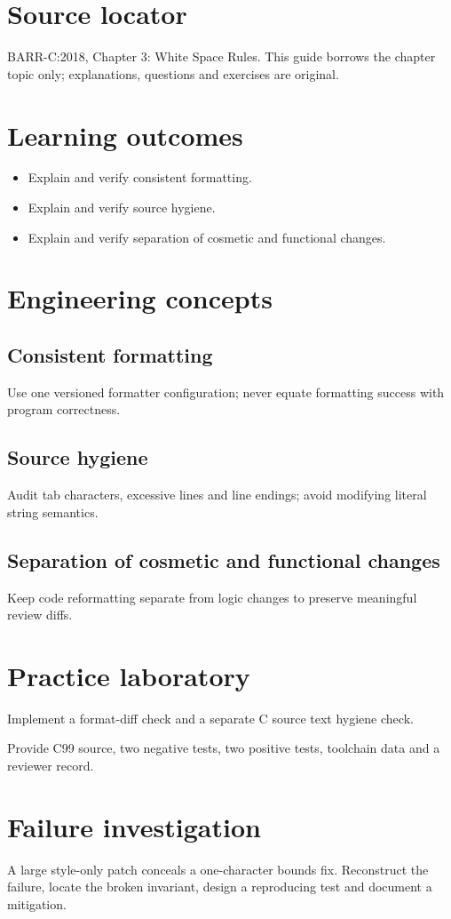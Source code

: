 \documentclass[10pt,letterpaper]{article}
\begin{document}
\makedoctitle
\makedocsummary
\section{Source locator}
BARR-C:2018, Chapter 3: White Space Rules. This guide borrows the chapter topic only; explanations, questions and exercises are original.
\section{Learning outcomes}
\begin{itemize}
\item Explain and verify consistent formatting.
\item Explain and verify source hygiene.
\item Explain and verify separation of cosmetic and functional changes.
\end{itemize}

\section{Engineering concepts}
\subsection{Consistent formatting}
Use one versioned formatter configuration; never equate formatting success with program correctness.

\subsection{Source hygiene}
Audit tab characters, excessive lines and line endings; avoid modifying literal string semantics.

\subsection{Separation of cosmetic and functional changes}
Keep code reformatting separate from logic changes to preserve meaningful review diffs.

\section{Practice laboratory}
Implement a format-diff check and a separate C source text hygiene check.

Provide C99 source, two negative tests, two positive tests, toolchain data and a reviewer record.
\section{Failure investigation}
A large style-only patch conceals a one-character bounds fix. Reconstruct the failure, locate the broken invariant, design a reproducing test and document a mitigation.
\end{document}

